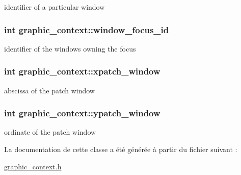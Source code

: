 identifier of a particular window \hypertarget{classgraphic__context_afb842574bef9200a343eae5ed25b6aea}{
\subsubsection[{window\+\_\+focus\+\_\+id}]{\setlength{\rightskip}{0pt plus 5cm}int graphic\+\_\+context\+::window\+\_\+focus\+\_\+id}}\label{classgraphic__context_afb842574bef9200a343eae5ed25b6aea}
identifier of the windows owning the focus \hypertarget{classgraphic__context_a57a5bcca338d0b27c5014b9bde3f6e99}{
\subsubsection[{xpatch\+\_\+window}]{\setlength{\rightskip}{0pt plus 5cm}int graphic\+\_\+context\+::xpatch\+\_\+window}}\label{classgraphic__context_a57a5bcca338d0b27c5014b9bde3f6e99}
abscissa of the patch window \hypertarget{classgraphic__context_ae902bd96df3912441f3f5e99cd802fbf}{
\subsubsection[{ypatch\+\_\+window}]{\setlength{\rightskip}{0pt plus 5cm}int graphic\+\_\+context\+::ypatch\+\_\+window}}\label{classgraphic__context_ae902bd96df3912441f3f5e99cd802fbf}
ordinate of the patch window 

La documentation de cette classe a été générée à partir du fichier suivant \+:\begin{DoxyCompactItemize}
\item 
\hyperlink{graphic__context_8h}{graphic\+\_\+context.\+h}\end{DoxyCompactItemize}
